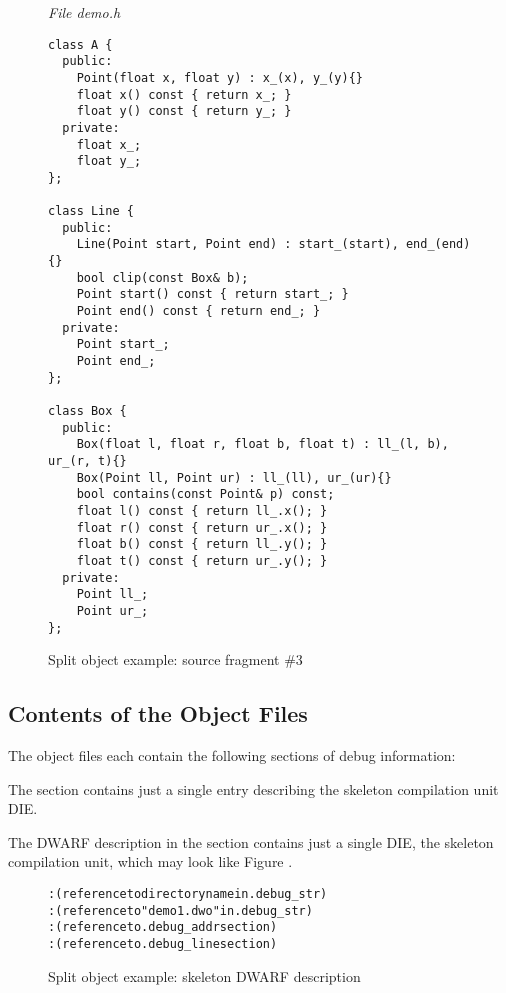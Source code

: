 \begin{figure}[ht]
\textit{File demo.h}
\begin{lstlisting}
class A {
  public:
    Point(float x, float y) : x_(x), y_(y){}
    float x() const { return x_; }
    float y() const { return y_; }
  private:
    float x_;
    float y_;
};

class Line {
  public:
    Line(Point start, Point end) : start_(start), end_(end){}
    bool clip(const Box& b);
    Point start() const { return start_; }
    Point end() const { return end_; }
  private:
    Point start_;
    Point end_;
};

class Box {
  public:
    Box(float l, float r, float b, float t) : ll_(l, b), ur_(r, t){}
    Box(Point ll, Point ur) : ll_(ll), ur_(ur){}
    bool contains(const Point& p) const;
    float l() const { return ll_.x(); }
    float r() const { return ur_.x(); }
    float b() const { return ll_.y(); }
    float t() const { return ur_.y(); }
  private:
    Point ll_;
    Point ur_;
};

\end{lstlisting}
\caption{Split object example: source fragment \#3}
\label{fig:splitobjectexamplesourcefragment3}
\end{figure}

\clearpage
\bb
\subsection{Contents of the Object Files}
\eb
The object files each contain the following sections of debug
information:
\begin{alltt}
  \dotdebugabbrev
  \dotdebuginfo
  \dotdebugline
  \dotdebugstr
  \dotdebugaddr
  \dotdebugnames
  \dotdebugaranges
\end{alltt}

The \dotdebugabbrev{} section contains just a single entry describing
the skeleton compilation unit DIE.

The DWARF description in the \dotdebuginfo{} section 
contains just a single DIE, the skeleton compilation unit, 
which may look like 
Figure .

\begin{figure}[ht]
\begin{dwflisting}
\begin{alltt}

    \DWTAGskeletonunit
        \DWATcompdir: (reference to directory name in .debug_str)
        \DWATdwoname: (reference to "demo1.dwo" in .debug_str)
        \DWATaddrbase: (reference to .debug_addr section)
        \DWATstmtlist: (reference to .debug_line section)
      
\end{alltt}
\bbeb
\end{dwflisting}
\caption{Split object example: skeleton DWARF description}
\label{fig:splitdwafexampleskeletondwarfdescription}
\end{figure}

